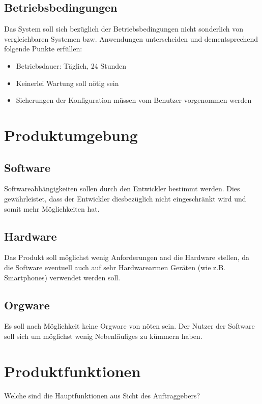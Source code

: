 \subsection{Betriebsbedingungen}
Das System soll sich bezüglich der Betriebsbedingungen nicht sonderlich von vergleichbaren Systemen bzw.
Anwendungen unterscheiden und dementsprechend folgende Punkte erfüllen:
\begin{itemize}
        \item Betriebsdauer: Täglich, 24 Stunden
        \item Keinerlei Wartung soll nötig sein
        \item Sicherungen der Konfiguration müssen vom Benutzer vorgenommen werden
\end{itemize}

\section{Produktumgebung}
\subsection{Software}
Softwareabhängigkeiten sollen durch den Entwickler bestimmt werden.
Dies gewährleistet, dass der Entwickler diesbezüglich nicht eingeschränkt wird
und somit mehr Möglichkeiten hat.

\subsection{Hardware}
Das Produkt soll möglichst wenig Anforderungen and die Hardware stellen, da
die Software eventuell auch auf sehr Hardwarearmen Geräten (wie z.B. Smartphones)
verwendet werden soll.

\subsection{Orgware}
Es soll nach Möglichkeit keine Orgware von nöten sein. Der Nutzer der Software soll sich
um möglichst wenig Nebenläufiges zu kümmern haben.

\section{Produktfunktionen}
Welche sind die Hauptfunktionen aus Sicht des Auftraggebers?

